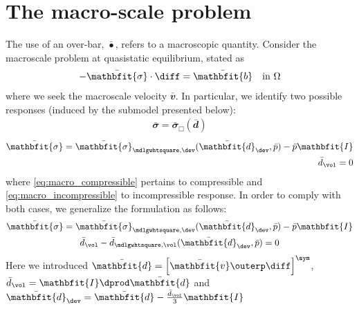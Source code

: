 \documentclass[a4paper,11pt]{article}
\renewcommand{\ta}[1]{\mathbfit{#1}}
\renewcommand{\ts}[1]{\mathbfit{#1}}
\renewcommand{\Box}{\mdlgwhtsquare}
\begin{document}
\section{The macro-scale problem} \label{sec:macro}
The use of an over-bar, $\bar{\bullet}$, refers to a macroscopic quantity.
Consider the macroscale problem at quasistatic equilibrium, stated as
\begin{align}
 -\bar{\ts\sigma}\cdot \diff = \bar{\ts b} \quad \text{in } \Omega
\end{align}
where we seek the macroscale velocity $\bar{\ts v}$. In particular, we identify two possible responses (induced by the submodel presented below):
\begin{gather}
 \bar{\ts\sigma} = \bar{\ts\sigma}_\Box(\bar{\ts d}) \label{eq:macro_compressible}
\end{gather}
\vspace{-2\baselineskip} %
\begin{subequations} \label{eq:macro_incompressible}
\begin{align}
  \bar{\ts\sigma} = \bar{\ts\sigma}_{\Box,\dev}(\bar{\ts d}_\dev, \bar p) - \bar p \ts I\\
  \bar{d}_\vol = 0
\end{align}
\end{subequations}
where \eqref{eq:macro_compressible} pertains to compressible and \eqref{eq:macro_incompressible} to incompressible response.
In order to comply with both cases, we generalize the formulation as follows:
\begin{subequations} \label{eq:macro_mixed}
\begin{gather}
 \bar{\ts\sigma} = \bar{\ts\sigma}_{\Box,\dev}(\bar{\ts d}_\dev,\bar p) - \bar p\ts I\\
 \bar{d}_\vol - \bar{d}_{\Box,\vol}(\bar{\ts d}_\dev, \bar p) = 0
\end{gather}
\end{subequations}
Here we introduced $\bar{\ts d} = \left[ \bar{\ta v} \outerp \diff \right]^\sym$, $\bar{d}_\vol = \ts I \dprod \bar{\ts d}$ and $\bar{\ts d}_\dev = \bar{\ts d} - \frac{\bar d_\vol}{3}\ts I$ 
\end{document}
